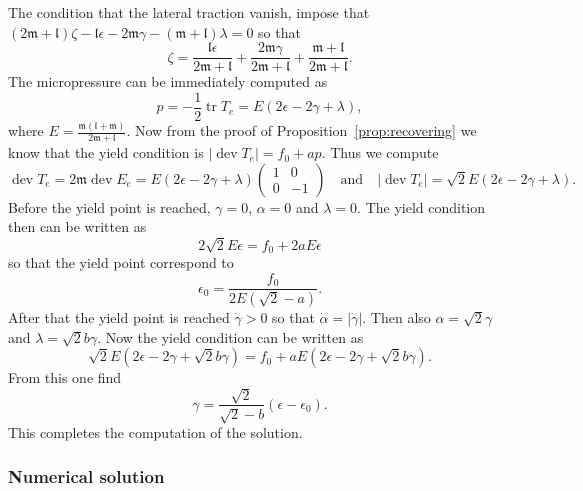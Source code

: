 \documentclass[a4paper,10pt,oneside]{amsbook}
\numberwithin{section}{chapter}
\numberwithin{equation}{chapter}
\theoremstyle{definition}
\DeclareMathOperator{\dev}{dev}
\DeclareMathOperator{\tr}{tr}
\begin{document}
The condition that the lateral traction vanish, impose that $(2\mathfrak{m}+\mathfrak{l})\zeta-\mathfrak{l}\epsilon-2\mathfrak{m}\gamma-(\mathfrak{m}+\mathfrak{l})\lambda=0$ so that
\[
\zeta=\frac{\mathfrak{l}\epsilon}{2\mathfrak{m}+\mathfrak{l}}+\frac{2\mathfrak{m}\gamma}{2\mathfrak{m}+\mathfrak{l}}+\frac{\mathfrak{m}+\mathfrak{l}}{2\mathfrak{m}+\mathfrak{l}}.
\]
The micropressure can be immediately computed as
\[
p=-\frac{1}{2}\tr T_e=E(2\epsilon-2\gamma+\lambda),
\]
where $E=\frac{\mathfrak{m}(\mathfrak{l}+\mathfrak{m})}{2\mathfrak{m}+\mathfrak{l}}$. Now from the proof of Proposition~\ref{prop:recovering} we know that the yield condition is $|\dev T_e|=f_0+ap$. Thus we compute
\[
\dev T_e=2\mathfrak{m}\dev E_e=
E(2\epsilon-2\gamma+\lambda)\begin{pmatrix}
1 & 0 \\
0 & -1
\end{pmatrix}\quad\text{and}\quad|\dev T_e|=\sqrt{2}E(2\epsilon-2\gamma+\lambda).
\]
Before the yield point is reached, $\gamma=0$, $\alpha=0$ and $\lambda=0$. The yield condition then can be written as
\[
2\sqrt{2}E\epsilon=f_0+2aE\epsilon
\]
so that the yield point correspond to
\[
\epsilon_0=\frac{f_0}{2E(\sqrt{2}-a)}.
\]
After that the yield point is reached $\dot\gamma>0$ so that $\dot\alpha=|\dot\gamma|$. Then also $\alpha=\sqrt{2}\gamma$ and $\lambda=\sqrt{2}b\gamma$. Now the yield condition can be written as
\[
\sqrt{2}E(2\epsilon-2\gamma+\sqrt{2}b\gamma)=f_0+aE(2\epsilon-2\gamma+\sqrt{2}b\gamma).
\]
From this one find
\[
\gamma=\frac{\sqrt{2}}{\sqrt{2}-b}(\epsilon-\epsilon_0).
\]
This completes the computation of the solution.

\subsubsection*{Numerical solution}
\end{document}
